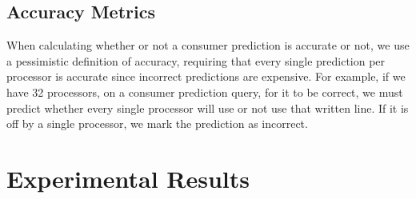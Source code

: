     \subsection{Accuracy Metrics}
        When calculating whether or not a consumer prediction is accurate or not, we use a pessimistic definition of accuracy, requiring that every single prediction per processor is accurate since incorrect predictions are expensive. For example, if we have 32 processors, on a consumer prediction query, for it to be correct, we must predict whether every single processor will use or not use that written line. If it is off by a single processor, we mark the prediction as incorrect.

\section{Experimental Results}
